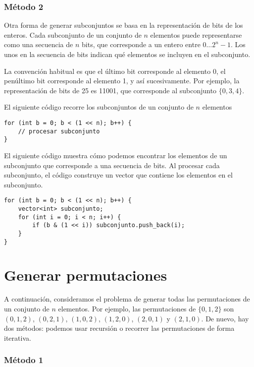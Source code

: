 \subsubsection{Método 2}

Otra forma de generar subconjuntos se basa en
la representación de bits de los enteros.
Cada subconjunto de un conjunto de $n$ elementos
puede representarse como una secuencia de $n$ bits,
que corresponde a un entero entre $0 \ldots 2^n-1$.
Los unos en la secuencia de bits indican
qué elementos se incluyen en el subconjunto.

La convención habitual es que
el último bit corresponde al elemento 0,
el penúltimo bit corresponde al elemento 1,
y así sucesivamente.
Por ejemplo, la representación de bits de 25
es 11001, que corresponde al subconjunto $\{0,3,4\}$.

El siguiente código recorre los subconjuntos
de un conjunto de $n$ elementos

\begin{lstlisting}
for (int b = 0; b < (1 << n); b++) {
    // procesar subconjunto
}
\end{lstlisting}

El siguiente código muestra cómo podemos encontrar
los elementos de un subconjunto que corresponde a una secuencia de bits.
Al procesar cada subconjunto,
el código construye un vector que contiene los
elementos en el subconjunto.

\begin{lstlisting}
for (int b = 0; b < (1 << n); b++) {
    vector<int> subconjunto;
    for (int i = 0; i < n; i++) {
        if (b & (1 << i)) subconjunto.push_back(i);
    }
}
\end{lstlisting}

\section{Generar permutaciones}


A continuación, consideramos el problema de generar
todas las permutaciones de un conjunto de $n$ elementos.
Por ejemplo, las permutaciones de $\{0,1,2\}$ son
$(0,1,2)$, $(0,2,1)$, $(1,0,2)$, $(1,2,0)$,
$(2,0,1)$ y $(2,1,0)$.
De nuevo, hay dos métodos:
podemos usar recursión o recorrer las
permutaciones de forma iterativa.

\subsubsection{Método 1}

